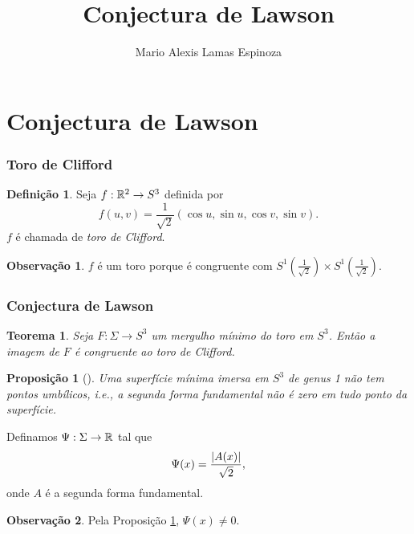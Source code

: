 \documentclass[12pt,a4paper]{beamer}
\author{Mario Alexis Lamas Espinoza}
\title{Conjectura de Lawson}
\newtheorem{teorema}{Teorema}
\newtheorem{proposicao}{Proposição}
\theoremstyle{definition}
\newtheorem{definicao}{Definição}
\newtheorem{observacao}{Observação}
\begin{document}
\begin{frame}
	\maketitle	
\end{frame}

\section{Conjectura de Lawson}

\begin{frame}
	\frametitle{Toro de Clifford}
	
	\begin{definicao}
		Seja $f: \mathbb R^2 \rightarrow S^3$ definida por
		\begin{equation*}
			f(u,v) = \frac{1}{\sqrt{2}} \left(\cos u, \sin u, \cos v, \sin v\right).
		\end{equation*}
		$f$ é chamada de \emph{toro de Clifford}.
	\end{definicao}

	\begin{observacao}
		$f$ é um toro porque é congruente com $S^1 \left(\frac{1}{\sqrt{2}}\right) \times S^1 \left(\frac{1}{\sqrt{2}}\right)$.
	\end{observacao}
\end{frame}

\begin{frame}
	\frametitle{Conjectura de Lawson}
	\begin{teorema}
		Seja $F: \Sigma \rightarrow S^3$ um mergulho mínimo do toro em $S^3$. Então a imagem de $F$ é congruente ao toro de Clifford.
	\end{teorema}
\end{frame}





\begin{frame}
	\begin{proposicao}[\cite{Brendle2013}]
		\label{sup-min-nao-tem-pontos-umbilicos}
		Uma superfície mínima imersa em $S^3$ de genus 1 não tem pontos umbílicos, i.e., a segunda forma fundamental não é zero em tudo ponto da superfície.
	\end{proposicao}
\end{frame}


\begin{frame}

	Definamos $\Psi: \Sigma \rightarrow \mathbb R$ tal que
	\begin{equation*}
	\Psi(x) = \frac{\left| A(x) \right|}{\sqrt{2}},
	\end{equation*}
	onde $A$ é a segunda forma fundamental.

	\begin{observacao}
		Pela Proposição \ref{sup-min-nao-tem-pontos-umbilicos}, $\Psi(x) \neq 0$.
	\end{observacao}

\end{frame}
\end{document}
